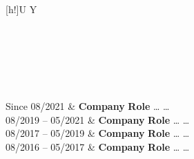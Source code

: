 \begin{xltabular}{\textwidth}[h!]{U Y}

 \hrulefill \\ \\ 
\endfirsthead

 \hrulefill \\ \\
\endhead

Since %
08/2021 			&	\textbf{Company} \newline
						\textbf{Role} \newline
						\dots \newline
						\dots \newline
						\\
					
08/2019 – %
05/2021 			&	\textbf{Company} \newline
						\textbf{Role} \newline
						\dots \newline
						\dots \newline
						\\

					
08/2017 – %
05/2019 			&	\textbf{Company} \newline
						\textbf{Role} \newline
						\dots \newline
						\dots \newline
						\\

					
08/2016 – %
05/2017 			&	\textbf{Company} \newline
						\textbf{Role} \newline
						\dots \newline
						\dots \newline
						\\
						

\end{xltabular}